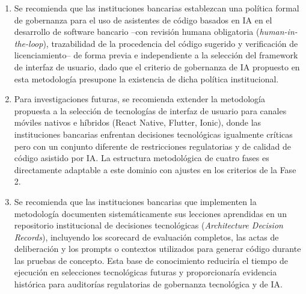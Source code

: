 \begin{enumerate}
  \item Se recomienda que las instituciones bancarias establezcan una
        política formal de gobernanza para el uso de asistentes de código
        basados en IA en el desarrollo de software bancario --con revisión
        humana obligatoria (\emph{human-in-the-loop}), trazabilidad de la
        procedencia del código sugerido y verificación de licenciamiento--
        de forma previa e independiente a la selección del framework de
        interfaz de usuario, dado que el criterio de gobernanza de IA
        propuesto en esta metodología presupone la existencia de dicha
        política institucional.

  \item Para investigaciones futuras, se recomienda extender la metodología
        propuesta a la selección de tecnologías de interfaz de usuario para
        canales móviles nativos e híbridos (React Native, Flutter, Ionic),
        donde las instituciones bancarias enfrentan decisiones tecnológicas
        igualmente críticas pero con un conjunto diferente de restricciones
        regulatorias y de calidad de código asistido por IA. La estructura
        metodológica de cuatro fases es directamente adaptable a este
        dominio con ajustes en los criterios de la Fase 2.

  \item Se recomienda que las instituciones bancarias que implementen la
        metodología documenten sistemáticamente sus lecciones aprendidas en
        un repositorio institucional de decisiones tecnológicas
        (\emph{Architecture Decision Records}), incluyendo los scorecard de
        evaluación completos, las actas de deliberación y los prompts o
        contextos utilizados para generar código durante las pruebas de
        concepto. Esta base de conocimiento reduciría el tiempo de ejecución
        en selecciones tecnológicas futuras y proporcionaría evidencia
        histórica para auditorías regulatorias de gobernanza tecnológica y
        de IA.
\end{enumerate}
